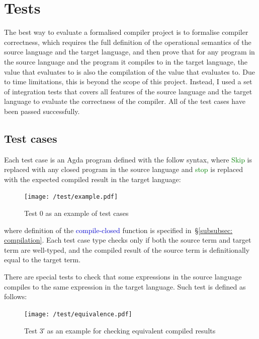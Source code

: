 \documentclass[12pt,a4paper]{report}
\theoremstyle{definition}
\newcommand{\secref}[1]{\S\ref{#1}}
\newcommand{\mb}[1]{\textcolor{mediumblue}{#1}}
\newcommand{\gn}[1]{\textcolor{green}{#1}}
\begin{document}
    \section{Tests}
    The best way to evaluate a formalised compiler project is to formalise compiler correctness, which requires the full definition of the operational semantics of the source language and the target language, and then prove that for any program  in the source language and the program  it compiles to in the target language, the value  that  evaluates to is also the compilation of the value  that  evaluates to. Due to time limitations, this is beyond the scope of this project. Instead, I used a set of integration tests that covers all features of the source language and the target language to evaluate the correctness of the compiler. All of the test cases have been passed successfully.

    \subsection{Test cases}
    Each test case is an Agda program defined with the follow syntax, where \gn{\textsf{Skip}} is replaced with any closed program in the source language and \gn{\textsf{stop}} is replaced with the expected compiled result in the target language:
    \begin{figure}[H]
        \centering
        \texttt{[image: /test/example.pdf]}
        \caption{Test 0 as an example of test cases}
        \label{fig: test_case_0}
    \end{figure}
    where definition of the \mb{\textsf{compile-closed}} function is specified in~\secref{subsubsec: compilation}. Each test case type checks only if both the source term and target term are well-typed, and the compiled result of the source term is definitionally equal to the target term.

    There are special tests to check that some expressions in the source language compiles to the same expression in the target language. Such test is defined as follows:
    \begin{figure}[H]
        \centering
        \texttt{[image: /test/equivalence.pdf]}
        \caption{Test 3′ as an example for checking equivalent compiled results}
        \label{fig: test_case_3′}
    \end{figure}
\end{document}
